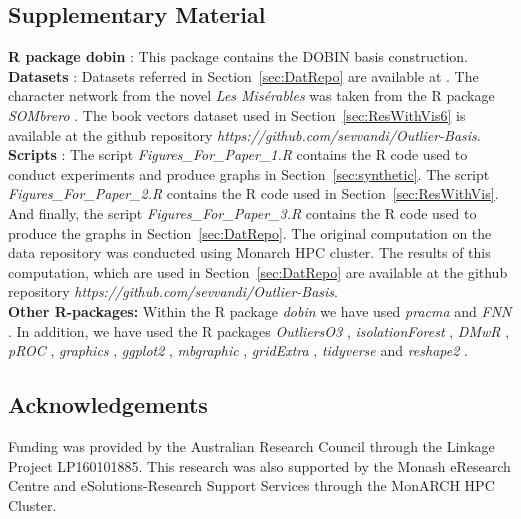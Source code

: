 \documentclass[11pt]{article}
\begin{document}
\subsection*{Supplementary Material}
{\bf R package dobin} : This package contains the DOBIN basis construction.  \\
{\bf Datasets} : Datasets referred in Section~\ref{sec:DatRepo} are available at \cite{datasets}. The character network from the novel \textit{Les Mis\'erables} was taken from the R package \textit{SOMbrero} \citep{sombrero}. The book vectors dataset used in Section~\ref{sec:ResWithVis6} is available at the github repository \textit{https://github.com/sevvandi/Outlier-Basis}. \\
{\bf Scripts }: The script \textit{Figures\_For\_Paper\_1.R} contains the R code used to conduct experiments and produce graphs in Section~\ref{sec:synthetic}. The script  \textit{Figures\_For\_Paper\_2.R} contains the R code used in  Section~\ref{sec:ResWithVis}. And finally, the script  \textit{Figures\_For\_Paper\_3.R} contains the R code used to produce the graphs in Section~\ref{sec:DatRepo}.  The original  computation on the data repository was conducted using  Monarch HPC cluster. The results of this computation, which are used in  Section~\ref{sec:DatRepo} are available at the github repository \textit{https://github.com/sevvandi/Outlier-Basis}. \\
{\bf Other R-packages:} Within the R package \textit{dobin} we have used \textit{pracma} \citep{pracma} and \textit{FNN} \citep{FNN}. In addition, we have used the R packages \textit{OutliersO3} \citep{O3Rpack}, \textit{isolationForest}  \citep{isolationForest}, \textit{DMwR} \citep{DMwR}, \textit{pROC} \citep{pROC}, \textit{graphics} \citep{graphics}, \textit{ggplot2} \citep{ggplot2}, \textit{mbgraphic} \citep{mbgraphic}, \textit{gridExtra} \citep{gridextra}, \textit{tidyverse} \citep{tidyverse} and \textit{reshape2} \citep{reshape2}.



\subsection*{Acknowledgements}

Funding was provided by the Australian Research Council through the Linkage Project LP160101885. This research was also supported by the Monash eResearch Centre and eSolutions-Research Support Services through the MonARCH HPC Cluster.


\footnotesize

\end{document}
